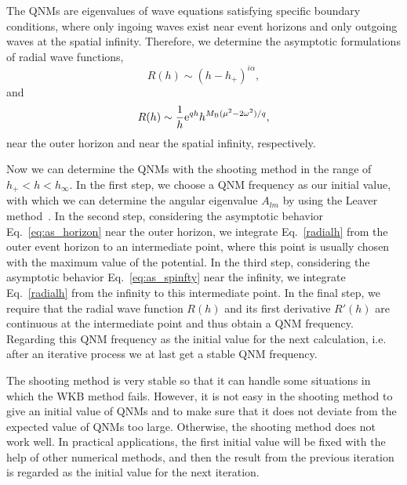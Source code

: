 \documentclass[12pt]{article}
\begin{document}
The QNMs are eigenvalues of wave equations satisfying specific boundary conditions, where only ingoing waves exist near event horizons and only outgoing waves at the spatial infinity. 
Therefore, we determine the asymptotic formulations of radial wave functions,
    \begin{equation}\label{eq:as_horizon}
    	R(h)\sim (h-h_+)^{ i\alpha},
    \end{equation}
 and 
    \begin{equation}\label{eq:as_spinfty}
    	R(h)\sim \frac{1}{h}\mathrm e^{ qh}h^{M_{\rm B}(\mu^2-2\omega^2)/q},
    \end{equation}
near the outer horizon and near the spatial infinity, respectively.
    
Now we can determine the QNMs with the shooting method in the range of  $h_+<h<h_\infty$. In the first step, we choose a QNM frequency  as our initial value, with which we can determine the angular eigenvalue $A_{lm}$ by using the Leaver method~\cite{leaver1985analytic}. In the second step, considering the asymptotic behavior Eq.~\eqref{eq:as_horizon} near the outer horizon, we integrate Eq.~\eqref{radialh} from the outer event horizon to an intermediate point, where this point is usually chosen with the maximum value of the potential.  
In the third step, considering the asymptotic behavior Eq.~\eqref{eq:as_spinfty} near the infinity, we integrate Eq.~\eqref{radialh} from the infinity to this intermediate point. 
In the final step, we require that the radial wave function $R(h)$ and its first derivative $R'(h)$ are continuous\footnotemark[1] at the intermediate point and thus obtain a QNM frequency. Regarding this QNM frequency as the initial value for the next calculation, i.e. after an iterative process we at last get a stable QNM frequency.

The shooting method is very stable so that it can handle some situations in which the WKB method fails.
However, it is not easy in the shooting method to give an initial value of QNMs and to make sure that it does not deviate from the expected value of QNMs too large. Otherwise, the shooting method does not work well.
In practical applications, the first initial value will be fixed with the help of other numerical methods, and then the result from the previous iteration is regarded as the initial value for the next iteration.
\end{document}
